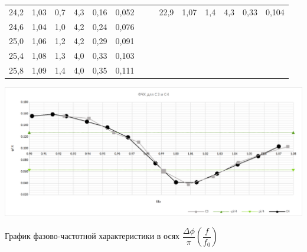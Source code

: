 \documentclass{article}
\begin{document}
\begin{center}
\begin{tabular}{|l|l|l|l|l|l|llllllll}
    24,2                          & 1,03                         & 0,7    & 4,3      & 0,16     & 0,052        &  & \multicolumn{1}{l|}{} & \multicolumn{1}{l|}{22,9}    & \multicolumn{1}{l|}{1,07}    & \multicolumn{1}{l|}{1,4}    & \multicolumn{1}{l|}{4,3}      & \multicolumn{1}{l|}{0,33}     & \multicolumn{1}{l|}{0,104}        \\ \cline{1-6} \cline{9-14} 
    24,6                          & 1,04                         & 1,0    & 4,2      & 0,24     & 0,076        &  &                       &                              &                              &                             &                               &                               &                                   \\ \cline{1-6}
    25,0                          & 1,06                         & 1,2    & 4,2      & 0,29     & 0,091        &  &                       &                              &                              &                             &                               &                               &                                   \\ \cline{1-6}
    25,4                          & 1,08                         & 1,3    & 4,0      & 0,33     & 0,103        &  &                       &                              &                              &                             &                               &                               &                                   \\ \cline{1-6}
    25,8                          & 1,09                         & 1,4    & 4,0      & 0,35     & 0,111        &  &                       &                              &                              &                             &                               &                               &                                   \\ \cline{1-6}
    \end{tabular}
\end{center}

\begin{center}
    \includegraphics[width=17cm]{FCH.png}
    \caption{График фазово-частотной характеристики в осях $ \dfrac{\Delta\phi}{\pi}  \left( \dfrac{f}{f_0} \right) $}
\end{center}
\end{document}
